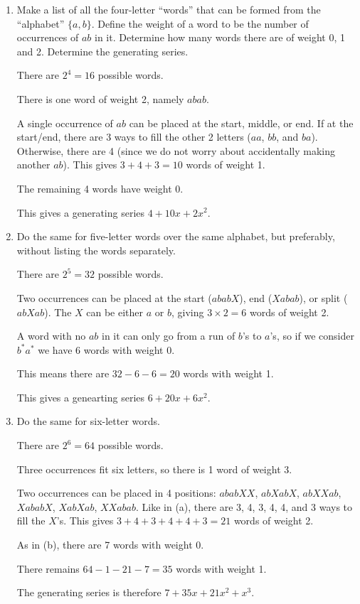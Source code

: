 \documentclass[class=math239,notes]{agony}
\begin{document}
\begin{xca}\end{xca}
\begin{enumerate}
  \item Make a list of all the four-letter ``words''
        that can be formed from the ``alphabet'' $\{a, b\}$.
        Define the weight of a word to be the number of occurrences of $ab$ in it.
        Determine how many words there are of weight 0, 1 and 2.
        Determine the generating series.
        \begin{sol}
          There are $2^4 = 16$ possible words.

          There is one word of weight 2, namely $abab$.

          A single occurrence of $ab$ can be placed at the start, middle, or end.
          If at the start/end, there are 3 ways to fill the other 2 letters ($aa$, $bb$, and $ba$).
          Otherwise, there are 4 (since we do not worry about accidentally making another $ab$).
          This gives $3+4+3 = 10$ words of weight 1.

          The remaining 4 words have weight 0.

          This gives a generating series $4 + 10x + 2x^2$.
        \end{sol}
  \item Do the same for five-letter words over the same alphabet, but preferably,
        without listing the words separately.
        \begin{sol}
          There are $2^5 = 32$ possible words.

          Two occurrences can be placed at the start ($ababX$), end ($Xabab$), or split ($abXab$).
          The $X$ can be either $a$ or $b$, giving $3 \times 2 = 6$ words of weight 2.

          A word with no $ab$ in it can only go from a run of $b$'s to $a$'s,
          so if we consider $b^* a^*$ we have 6 words with weight 0.

          This means there are $32 - 6 - 6 = 20$ words with weight 1.

          This gives a genearting series $6 + 20x + 6x^2$.
        \end{sol}
  \item Do the same for six-letter words.
        \begin{sol}
          There are $2^6 = 64$ possible words.

          Three occurrences fit six letters, so there is 1 word of weight 3.

          Two occurrences can be placed in 4 positions:
          $ababXX$, $abXabX$, $abXXab$, $XababX$, $XabXab$, $XXabab$.
          Like in (a), there are 3, 4, 3, 4, 4, and 3 ways to fill the $X$'s.
          This gives $3 + 4 + 3 + 4 + 4 + 3 = 21$ words of weight 2.

          As in (b), there are 7 words with weight 0.

          There remains $64 - 1 - 21 - 7 = 35$ words with weight 1.

          The generating series is therefore $7 + 35x + 21x^2 + x^3$.
        \end{sol}
\end{enumerate}
\end{document}
